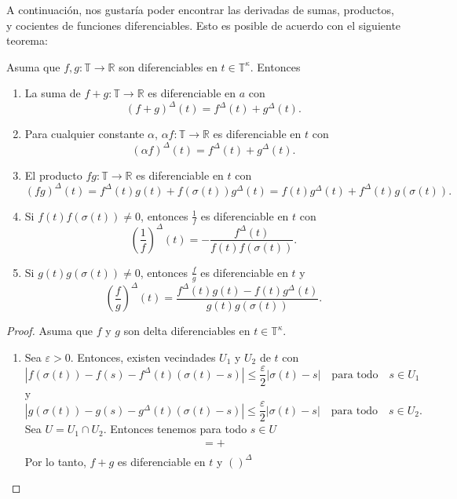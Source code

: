 A continuación, nos gustaría poder encontrar las derivadas de sumas, productos, y cocientes de funciones diferenciables. Esto es posible de acuerdo con el siguiente teorema:
\begin{theorem}{}
	Asuma que $f,g\colon\mathds{T}\rightarrow\mathds{R}$ son diferenciables en $t\in\mathds{T}^{\kappa}$. Entonces
	\begin{enumerate}
		\item La suma de $f+g\colon\mathds{T}\rightarrow\mathds{R}$ es diferenciable en $a$ con \[ {\left(f+g\right)}^{\Delta}(t)=f^{\Delta}(t)+g^{\Delta}(t). \]
		\item Para cualquier constante $\alpha$, $\alpha f\colon\mathds{T}\rightarrow\mathds{R}$ es diferenciable en $t$ con \[ {\left(\alpha f\right)}^{\Delta}\left(t\right)=f^{\Delta}\left(t\right)+g^{\Delta}\left(t\right). \]
		\item El producto $fg\colon\mathds{T}\rightarrow\mathds{R}$ es diferenciable en $t$ con \[ {\left(fg\right)}^{\Delta}\left(t\right)=f^{\Delta}\left(t\right)g\left(t\right)+f\left(\sigma\left(t\right)\right)g^{\Delta}\left(t\right)=f\left(t\right)g^{\Delta}\left(t\right)+f^{\Delta}\left(t\right)g\left(\sigma\left(t\right)\right). \]
		\item Si $f\left(t\right)f\left(\sigma\left(t\right)\right)\neq0$, entonces $\frac{1}{f}$ es diferenciable en $t$ con \[ {\left(\frac{1}{f}\right)}^{\Delta}\left(t\right)=-\frac{f^{\Delta}\left(t\right)}{f\left(t\right)f\left(\sigma\left(t\right)\right)}. \]
		\item Si $g\left(t\right)g\left(\sigma\left(t\right)\right)\neq0$, entonces $\frac{f}{g}$ es diferenciable en $t$ y \[ {\left(\frac{f}{g}\right)}^{\Delta}\left(t\right)=\frac{f^{\Delta}\left(t\right)g\left(t\right)-f\left(t\right)g^{\Delta}\left(t\right)}{g\left(t\right)g\left(\sigma\left(t\right)\right)}. \]
	\end{enumerate}
\end{theorem}
\begin{proof}
	Asuma que $f$ y $g$ son delta diferenciables en $t\in\mathds{T}^{\kappa}$.
	\begin{enumerate}
		\item Sea $\varepsilon>0$. Entonces, existen vecindades $U_{1}$ y $U_{2}$ de $t$ con \[ \left|f\left(\sigma\left(t\right)\right)-f\left(s\right)-f^{\Delta}\left(t\right)\left(\sigma\left(t\right)-s\right)\right|\leq\frac{\varepsilon}{2}\left|\sigma\left(t\right)-s\right|\quad\text{para todo}\quad s\in U_{1} \] y \[ \left|g\left(\sigma\left(t\right)\right)-g\left(s\right)-g^{\Delta}\left(t\right)\left(\sigma\left(t\right)-s\right)\right|\leq\frac{\varepsilon}{2}\left|\sigma\left(t\right)-s\right|\quad\text{para todo}\quad s\in U_{2}. \] Sea $U=U_{1}\cap U_{2}$. Entonces tenemos para todo $s\in U$
		\begin{align*}
		=+\\
		\end{align*}
		Por lo tanto, $f+g$ es diferenciable en $t$ y ${\left(\right)}^{\Delta}$
	\end{enumerate}
\end{proof}